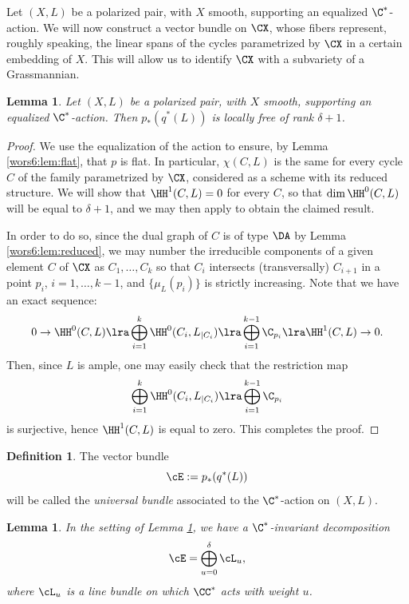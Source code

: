 \documentclass[reqno]{amsproc}
\newtheorem{lemma}[theorem]{Lemma}
\theoremstyle{definition}
\newtheorem{definition}[theorem]{Definition}
\begin{document}
Let $(X,L)$ be a polarized pair, with $X$ smooth, supporting an equalized $\C^*$-action.
We will now construct a vector bundle on $\CX$, whose fibers represent, roughly speaking, the linear spans  of the cycles parametrized by $\CX$ in a certain embedding of $X$. This will allow us to identify $\CX$ with a  subvariety of a Grassmannian. 

\begin{lemma}\label{wors6:lem:univbdl}
Let $(X,L)$ be a polarized pair, with $X$ smooth, supporting an equalized $\C^*$-action.  
Then $p_*(q^*(L))$ is locally free of rank $\delta+1$.
\end{lemma}

\begin{proof}
We use the equalization of the action to ensure, by Lemma \ref{wors6:lem:flat}, that $p$ is flat. In particular, $\chi(C,L)$ is the same for every cycle $C$  of the family parametrized by $\CX$, considered as a scheme with its reduced structure. We will show that $\HH^1(C,L)=0$ for every $C$, so that $\dim\HH^0(C,L)$ will be equal to $\delta+1$, and we may then apply \cite[Corollary~III.12.9]{wors6-Ha} to obtain the claimed result. 

In order to do so, since the dual graph of $C$ is of type $\DA$ by Lemma \ref{wors6:lem:reduced}, we may  number the irreducible components  of a given element $C$ of $\CX$ as $C_1,\dots,C_k$  so that $C_i$ intersects (transversally) $C_{i+1}$ in a point $p_i$, $i=1,\dots,k-1$, and $\{\mu_L(p_i)\}$ is strictly increasing. Note that we have an exact sequence:
\begin{equation}
0\to \HH^0(C,L)\lra \bigoplus_{i=1}^{k}\HH^0(C_i,L_{|C_i})\lra \bigoplus_{i=1}^{k-1}\C_{p_i}\lra \HH^1(C,L)\to 0.
\label{wors6:eq:irredcomp}
\end{equation}
Then, since $L$ is ample, one may easily check that the restriction map
$$
\bigoplus_{i=1}^{k}\HH^0(C_i,L_{|C_i})\lra \bigoplus_{i=1}^{k-1}\C_{p_i}
$$
is surjective, hence  $\HH^1(C,L)$ is equal to zero. This completes the proof.
\end{proof}


\begin{definition}
The vector bundle $$\cE:=p_*(q^*(L))$$ will be called the {\em universal bundle} associated to the $\C^*$-action on $(X,L)$.
\end{definition}

\begin{lemma}
In the setting of Lemma \ref{wors6:lem:univbdl}, we have a $\C^*$-invariant decomposition $$\cE=\bigoplus_{u=0}^\delta \cL_u,$$ where $\cL_u$ is a line bundle on which $\CC^*$ acts with weight $u$.
\end{lemma}
\end{document}
